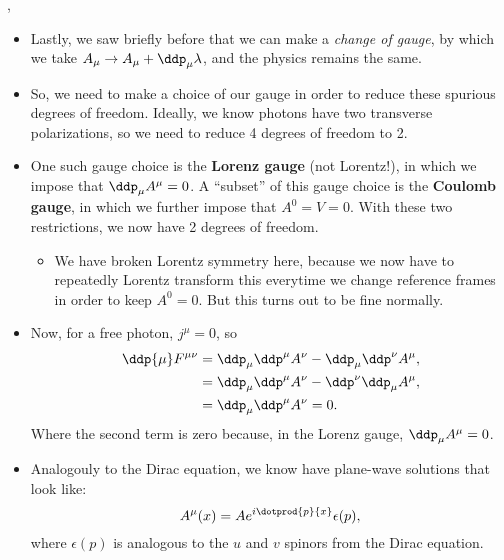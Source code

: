 \sep

\begin{itemize}
    \item Lastly, we saw briefly before that we can make a \textit{change of gauge}, by which we take $A_{\mu} \rightarrow A_{\mu} + \ddp_{\mu}\lambda$, and the physics remains the same.
    \item So, we need to make a choice of our gauge in order to reduce these spurious degrees of freedom. Ideally, we know photons have two transverse polarizations, so we need to reduce 4 degrees of freedom to 2.
    \item One such gauge choice is the \textbf{Lorenz gauge} (not Lorentz!), in which we impose that $\ddp_{\mu}A^{\mu} = 0$. A ``subset'' of this gauge choice is the \textbf{Coulomb gauge}, in which we further impose that $A^0 = V = 0$. With these two restrictions, we now have 2 degrees of freedom.
        \begin{itemize}
            \item We have broken Lorentz symmetry here, because we now have to repeatedly Lorentz transform this everytime we change reference frames in order to keep $A^0=0$. But this turns out to be fine normally.
        \end{itemize}
    \item Now, for a free photon, $j^{\mu}=0$, so 
        \begin{align*}
            \ddp{\mu}F^{\mu\nu} &= \ddp_{\mu}\ddp^{\mu}A^{\nu} - \ddp_{\mu}\ddp^{\nu}A^{\mu}, \\
            &= \ddp_{\mu}\ddp^{\mu}A^{\nu} - \ddp^{\nu}\ddp_{\mu}A^{\mu}, \\
            &= \ddp_{\mu}\ddp^{\mu}A^{\nu} = 0.
        \end{align*}
        Where the second term is zero because, in the Lorenz gauge, $\ddp_{\mu}A^{\mu}=0$.
    \item Analogouly to the Dirac equation, we know have plane-wave solutions that look like:
        \begin{equation*}
            A^{\mu}(x) = A e^{i\dotprod{p}{x}} \epsilon(p),
        \end{equation*}
        where $\epsilon(p)$ is analogous to the $u$ and $v$ spinors from the Dirac equation.
\end{itemize}